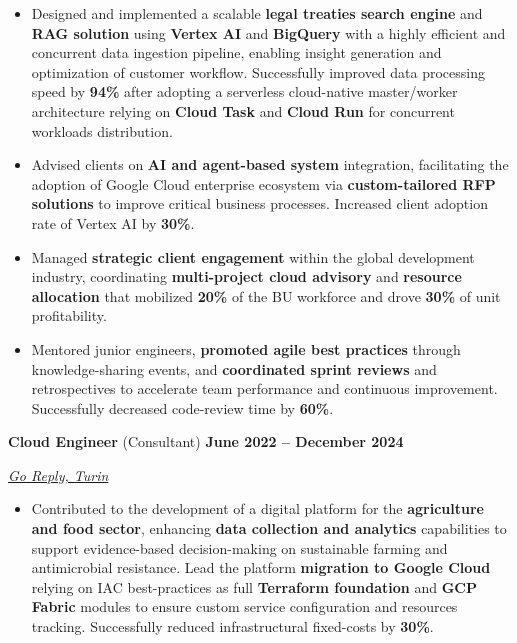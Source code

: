 \documentclass[9pt, a4paper]{article}
\newcommand{\jobsection}[3]{%
	\par {\large #1} \hfill {\bfseries #2} \par {\textit{#3}} \vspace{4pt}
}
\begin{document}
\begin{minipage}[t]{0.65\linewidth}
\begin{itemize}[leftmargin=*, nosep]
			\vspace{5pt}
			\item \footnotesize Designed and implemented a scalable \textbf{legal treaties search engine} and \textbf{RAG solution} using \textbf{Vertex AI} and \textbf{BigQuery} with a highly efficient and concurrent data ingestion pipeline, enabling insight generation and optimization of customer workflow. 
			Successfully improved data processing speed by \textbf{94\%} after adopting a serverless cloud-native master/worker architecture relying on \textbf{Cloud Task} and \textbf{Cloud Run} for concurrent workloads distribution.      
			
			\vspace{5pt}		
			\item \footnotesize Advised clients on \textbf{AI and agent-based system} integration, facilitating the adoption of Google Cloud enterprise ecosystem via \textbf{custom-tailored RFP solutions} to improve critical business processes.
			Increased client adoption rate of Vertex AI by \textbf{30\%}.  
			
			\vspace{5pt}
			\item \footnotesize Managed \textbf{strategic client engagement} within the global development industry, coordinating \textbf{multi-project cloud advisory} and \textbf{resource allocation} that mobilized \textbf{20\%} of the BU workforce and drove \textbf{30\%} of unit profitability.
			
			\vspace{5pt}
			\item \footnotesize Mentored junior engineers, \textbf{promoted agile best practices} through knowledge-sharing events, and \textbf{coordinated sprint reviews} and retrospectives to accelerate team performance and continuous improvement. 
			Successfully decreased code-review time by \textbf{60\%}.  
		\end{itemize}
		
		\vspace{6pt}
		\jobsection{\textbf{Cloud Engineer} (Consultant)}{June 2022 -- December 2024}{\href{https://www.reply.com/go-reply/en}{Go Reply, Turin}}
		\begin{itemize}[leftmargin=*, nosep]
			
			\item \footnotesize Contributed to the development of a digital platform for the \textbf{agriculture and food sector}, enhancing \textbf{data collection and analytics} capabilities to support evidence-based decision-making on sustainable farming and antimicrobial resistance. 
			Lead the platform \textbf{migration to Google Cloud} relying on IAC best-practices as full \textbf{Terraform foundation} and \textbf{GCP Fabric} modules to ensure custom service configuration and resources tracking.
			Successfully reduced infrastructural fixed-costs by \textbf{30\%}.
			

\end{itemize}
\end{minipage}
\end{document}

